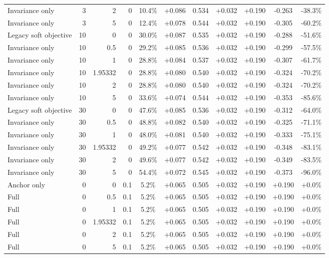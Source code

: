 \begin{table}[htbp]
\begin{tabular}{lrrrccccccc}
Invariance only & 3 & 2 & 0 & 10.4\% & +0.086 & 0.534 & +0.032 & +0.190 & -0.263 & -38.3\% \\
Invariance only & 3 & 5 & 0 & 12.4\% & +0.078 & 0.544 & +0.032 & +0.190 & -0.305 & -60.2\% \\
Legacy soft objective & 10 & 0 & 0 & 30.0\% & +0.087 & 0.535 & +0.032 & +0.190 & -0.288 & -51.6\% \\
Invariance only & 10 & 0.5 & 0 & 29.2\% & +0.085 & 0.536 & +0.032 & +0.190 & -0.299 & -57.5\% \\
Invariance only & 10 & 1 & 0 & 28.8\% & +0.084 & 0.537 & +0.032 & +0.190 & -0.307 & -61.7\% \\
Invariance only & 10 & 1.95332 & 0 & 28.8\% & +0.080 & 0.540 & +0.032 & +0.190 & -0.324 & -70.2\% \\
Invariance only & 10 & 2 & 0 & 28.8\% & +0.080 & 0.540 & +0.032 & +0.190 & -0.324 & -70.2\% \\
Invariance only & 10 & 5 & 0 & 33.6\% & +0.074 & 0.544 & +0.032 & +0.190 & -0.353 & -85.6\% \\
Legacy soft objective & 30 & 0 & 0 & 47.6\% & +0.085 & 0.536 & +0.032 & +0.190 & -0.312 & -64.0\% \\
Invariance only & 30 & 0.5 & 0 & 48.8\% & +0.082 & 0.540 & +0.032 & +0.190 & -0.325 & -71.1\% \\
Invariance only & 30 & 1 & 0 & 48.0\% & +0.081 & 0.540 & +0.032 & +0.190 & -0.333 & -75.1\% \\
Invariance only & 30 & 1.95332 & 0 & 49.2\% & +0.077 & 0.542 & +0.032 & +0.190 & -0.348 & -83.1\% \\
Invariance only & 30 & 2 & 0 & 49.6\% & +0.077 & 0.542 & +0.032 & +0.190 & -0.349 & -83.5\% \\
Invariance only & 30 & 5 & 0 & 54.4\% & +0.072 & 0.545 & +0.032 & +0.190 & -0.373 & -96.0\% \\
Anchor only & 0 & 0 & 0.1 & 5.2\% & +0.065 & 0.505 & +0.032 & +0.190 & +0.190 & +0.0\% \\
Full & 0 & 0.5 & 0.1 & 5.2\% & +0.065 & 0.505 & +0.032 & +0.190 & +0.190 & +0.0\% \\
Full & 0 & 1 & 0.1 & 5.2\% & +0.065 & 0.505 & +0.032 & +0.190 & +0.190 & +0.0\% \\
Full & 0 & 1.95332 & 0.1 & 5.2\% & +0.065 & 0.505 & +0.032 & +0.190 & +0.190 & +0.0\% \\
Full & 0 & 2 & 0.1 & 5.2\% & +0.065 & 0.505 & +0.032 & +0.190 & +0.190 & +0.0\% \\
Full & 0 & 5 & 0.1 & 5.2\% & +0.065 & 0.505 & +0.032 & +0.190 & +0.190 & +0.0\% \\

\end{tabular}
\end{table}
